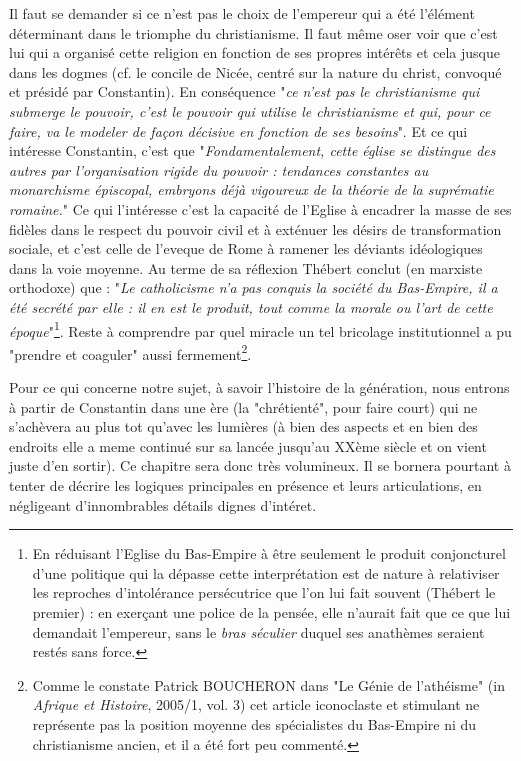 Il faut se demander si ce n'est pas le choix de l'empereur qui a été l'élément déterminant dans le triomphe du christianisme. Il faut même oser voir que c'est lui qui a organisé cette religion en fonction de ses propres intérêts et cela jusque dans les dogmes (cf. le concile de Nicée, centré sur la nature du christ, convoqué et présidé par Constantin). En conséquence "\emph{ce n'est pas le christianisme qui submerge le pouvoir, c'est le pouvoir qui utilise le christianisme et qui, pour ce faire, va le modeler de façon décisive en fonction de ses besoins}". Et ce qui intéresse Constantin, c'est que "\emph{Fondamentalement, cette église se distingue des autres par l'organisation rigide du pouvoir : tendances constantes au monarchisme épiscopal, embryons déjà vigoureux de la théorie de la suprématie romaine.}" Ce qui l'intéresse c'est la capacité de l'Eglise à encadrer la masse de ses fidèles dans le respect du pouvoir civil et à exténuer les désirs de transformation sociale, et c'est celle de l'eveque de Rome à ramener les déviants idéologiques dans la voie moyenne. Au terme de sa réflexion Thébert conclut (en marxiste orthodoxe) que : "\emph{Le catholicisme n'a pas conquis la société du Bas-Empire, il a été secrété par elle : il en est le produit, tout comme la morale ou l'art de cette époque}"\footnote{En réduisant l'Eglise du Bas-Empire à être seulement le produit conjoncturel d'une politique qui la dépasse cette interprétation est de nature à relativiser les reproches d'intolérance persécutrice que l'on lui fait souvent (Thébert le premier) : en exerçant une police de la pensée, elle n'aurait fait que ce que lui demandait l'empereur, sans le \emph{bras séculier} duquel ses anathèmes seraient restés sans force.}. Reste à comprendre par quel miracle un tel bricolage institutionnel a pu "prendre et coaguler" aussi fermement\footnote{Comme le constate Patrick BOUCHERON  dans "Le Génie de l'athéisme" (in \emph{Afrique et Histoire}, 2005/1, vol. 3) cet article iconoclaste et stimulant ne représente pas la position moyenne des spécialistes du Bas-Empire ni du christianisme ancien, et il a été fort peu commenté.}.

Pour ce qui concerne notre sujet, à savoir l'histoire de la génération, nous entrons à partir de Constantin dans une ère (la "chrétienté", pour faire court) qui ne s'achèvera au plus tot qu'avec les lumières (à bien des aspects et en bien des endroits elle a meme continué sur sa lancée jusqu'au XXème siècle et on vient juste d'en sortir). Ce chapitre sera donc très volumineux. Il se bornera pourtant à tenter de décrire les logiques principales en présence et leurs articulations, en négligeant d'innombrables détails dignes d'intéret.
